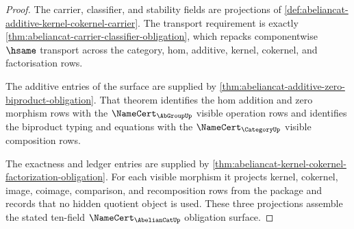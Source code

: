 \begin{proof}
The carrier, classifier, and stability fields are projections of
\autoref{def:abeliancat-additive-kernel-cokernel-carrier}. The transport
requirement is exactly
\autoref{thm:abeliancat-carrier-classifier-obligation}, which repacks
componentwise $\hsame$ transport across the category, hom, additive, kernel,
cokernel, and factorisation rows.

The additive entries of the surface are supplied by
\autoref{thm:abeliancat-additive-zero-biproduct-obligation}. That theorem
identifies the hom addition and zero morphism rows with the
$\NameCert_{\AbGroupUp}$ visible operation rows and identifies the biproduct
typing and equations with the $\NameCert_{\CategoryUp}$ visible composition
rows.

The exactness and ledger entries are supplied by
\autoref{thm:abeliancat-kernel-cokernel-factorization-obligation}. For each
visible morphism it projects kernel, cokernel, image, coimage, comparison, and
recomposition rows from the package and records that no hidden quotient object
is used. These three projections assemble the stated ten-field
$\NameCert_{\AbelianCatUp}$ obligation surface.
\end{proof}

